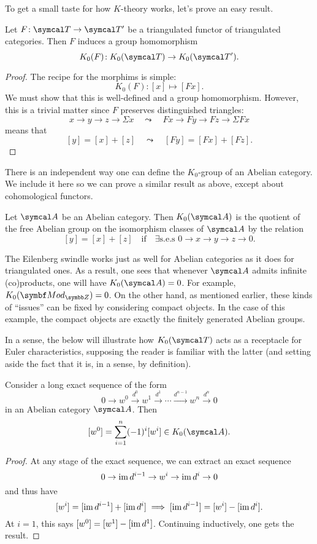 To get a small taste for how \(K\)-theory works, let's prove an easy result.
\begin{proposition}
	Let \(F\!:\calT\to\calT'\) be a triangulated functor of triangulated categories. Then \(F\) induces a group homomorphism
	\[ K_0(F)\!:K_0(\calT)\to K_0(\calT'). \]
\end{proposition}
\begin{proof}
The recipe for the morphims is simple:
\[ K_0(F)\!: [x]\mapsto [Fx]. \]
We must show that this is well-defined and a group homomorphism. However, this is a trivial matter since \(F\) preserves distinguished triangles:
\[ x \to y \to z \to \Sigma x \quad \leadsto \quad Fx \to Fy \to Fz \to \Sigma Fx \]
means that
\[ [y] = [x] + [z] \quad \leadsto \quad [Fy] = [Fx] + [Fz]. \]
\end{proof}

There is an independent way one can define the \(K_0\)-group of an Abelian category. We include it here so we can prove a similar result as above, except about cohomological functors.
\begin{definition}
	Let \(\calA\) be an Abelian category. Then \(K_0(\calA)\) is the quotient of the free Abelian group on the isomorphism classes of \(\calA\) by the relation
	\[ [y] = [x] + [z] \quad\text{if}\quad \exists\text{s.e.s } 0 \to x \to y \to z \to 0. \]
\end{definition}
\begin{remark}
	The Eilenberg swindle works just as well for Abelian categories as it does for triangulated ones. As a result, one sees that whenever \(\calA\) admits
	infinite (co)products, one will have \(K_0(\calA)=0\). For example, \(K_0(\Mod_{\Z}) = 0\). On the other hand, as mentioned earlier, these kinds of ``issues''
	can be fixed by considering compact objects. In the case of this example, the compact objects are exactly the finitely generated Abelian groups.
\end{remark}

In a sense, the below will illustrate how \(K_0(\calT)\) acts as a receptacle for Euler characteristics, supposing the reader is familiar with the latter (and setting aside the fact
that it is, in a sense, by definition).

\begin{lemma}
	Consider a long exact sequence of the form
	\[ 0 \to w^0 \overset{d^0}\to w^1 \overset{d^1}\to \cdots \overset{d^{n-1}}\to w^n \overset{d^n}\to 0 \]
	in an Abelian category \(\calA\). Then
	\[ [w^0] = \sum_{i=1}^n(-1)^i[w^i] \in K_0(\calA). \]
\end{lemma}
\begin{proof}
At any stage of the exact sequence, we can extract an exact sequence
\[ 0 \to \operatorname{im}{d^{i-1}} \to w^i \to \operatorname{im}{d^i} \to 0 \]
and thus have
\[ [w^i] = [\operatorname{im}{d^{i-1}}] + [\operatorname{im}{d^i}] \implies [\operatorname{im}{d^{i-1}}] = [w^i] - [\operatorname{im}{d^i}]. \]
At \(i=1\), this says \([w^0] = [w^1] - [\operatorname{im}{d^1}]\). Continuing inductively, one gets the result.
\end{proof}

